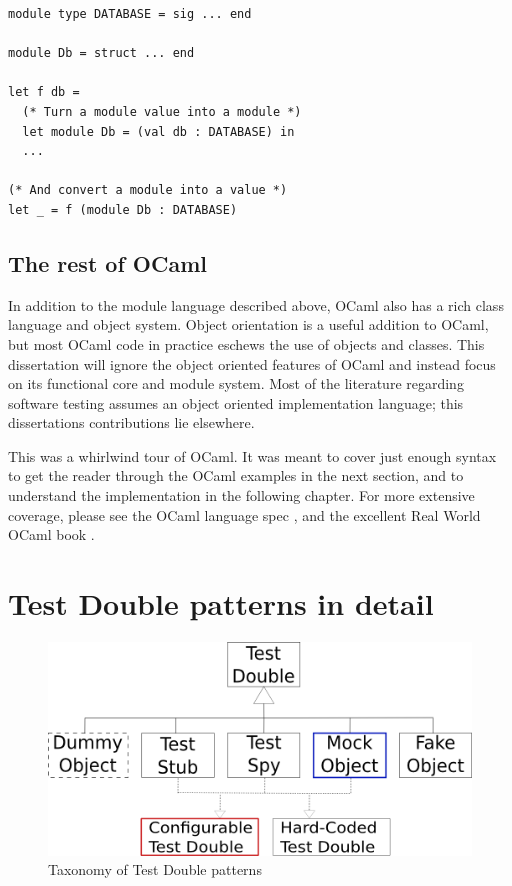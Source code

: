 \begin{lstlisting}
module type DATABASE = sig ... end

module Db = struct ... end

let f db =
  (* Turn a module value into a module *)
  let module Db = (val db : DATABASE) in
  ...

(* And convert a module into a value *)
let _ = f (module Db : DATABASE)
\end{lstlisting}

\subsection{The rest of OCaml}


In addition to the module language described above, OCaml also has a
rich class language and object system. Object orientation is a useful
addition to OCaml, but most OCaml code in practice eschews the use of
objects and classes. This dissertation will ignore the object oriented
features of OCaml and instead focus on its functional core and module
system. Most of the literature regarding software testing assumes
an object oriented implementation language; this dissertations
contributions lie elsewhere.

This was a whirlwind tour of OCaml. It was meant to cover just enough
syntax to get the reader through the OCaml examples in the next
section, and to understand the implementation in the following
chapter. For more extensive coverage, please see the OCaml language
spec \cite{ocaml:spec}, and the excellent Real World OCaml book
\cite{rwo}.

\section{Test Double patterns in detail}
\label{testdoubles}


\begin{figure}
  \centering
  \includegraphics[scale=0.7]{img/test_double_taxonomy.png}
  \caption[Taxonomy of Test Double patterns]{Taxonomy of Test Double patterns\footnotemark}
  \label{fig:taxonomy}
\end{figure}

